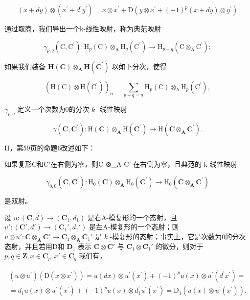 \[
(x + d y) \otimes (x ^ {\prime} + d ^ {\prime} y ^ {\prime}) = x \otimes x ^ {\prime} + \mathrm{D} (y \otimes x ^ {\prime} + (- 1) ^ {p} (x + d y) \otimes y ^ {\prime})
\]

通过取商，我们导出一个k-线性映射，称为典范映射

\[
\gamma_ {p, q} (\mathrm{C}, \mathrm{C} ^ {\prime}): \mathrm{H} _ {p} (\mathrm{C}) \otimes_ {\mathrm{A}} \mathrm{H} _ {q} (\mathrm{C} ^ {\prime}) \rightarrow \mathrm{H} _ {p + q} (\mathrm{C} \otimes_ {\mathrm{A}} \mathrm{C} ^ {\prime});
\]

如果我们装备 \(\mathbf{H}(\mathbf{C})\otimes_{\mathbf{A}}\mathbf{H}(\mathbf{C}^{\prime})\) 以如下分次，使得

\[
\left(\mathrm{H} (\mathrm{C}) \otimes \mathrm{H} (\mathrm{C} ^ {\prime})\right) _ {n} = \sum_ {p + q = n} \mathrm{H} _ {p} (\mathrm{C}) \otimes_ {\mathrm{A}} \mathrm{H} _ {p} (\mathrm{C} ^ {\prime}),
\]

\(\gamma_{p,q}\) 定义一个次数为0的分次 \(k\) -线性映射

\[
\gamma (\mathbf {C}, \mathbf {C} ^ {\prime}): \mathrm{H} (\mathbf {C}) \otimes_ {\mathbf {A}} \mathrm{H} (\mathbf {C} ^ {\prime}) \rightarrow \mathrm{H} (\mathbf {C} \otimes_ {\mathbf {A}} \mathbf {C} ^ {\prime}).
\]

II，第59页的命题6改述如下：

如果复形C和C'在右侧为零，则C ⊗\_A C' 在右侧为零，且典范的 k-线性映射

\[
\gamma_ {0, 0} (\mathbf {C}, \mathbf {C} ^ {\prime}): \mathrm{H} _ {0} (\mathbf {C}) \otimes_ {\mathbf {A}} \mathrm{H} _ {0} (\mathbf {C} ^ {\prime}) \rightarrow \mathrm{H} _ {0} (\mathbf {C} \otimes_ {\mathbf {A}} \mathbf {C} ^ {\prime})
\]

是双射。

设 \(u: (\mathbf{C}, d) \to (\mathbf{C}_1, d_1)\) 是右A-模复形的一个态射，且 \(u': (\mathbf{C}', d') \to (\mathbf{C}_1', d_1')\) 是左A-模复形的一个态射；则 \(u \otimes u': \mathbf{C} \otimes_{\mathbf{A}} \mathbf{C}' \to \mathbf{C}_1 \otimes_{\mathbf{A}} \mathbf{C}_1'\) 是 \(k\) -模复形的态射；事实上，它是次数为0的分次态射，并且若用D和 \(\mathbf{D}_1\) 表示 \(\mathbf{C} \otimes \mathbf{C}'\) 与 \(\mathbf{C}_1 \otimes \mathbf{C}_1'\) 的微分，则对于 \(p, q \in \mathbf{Z}, x \in \mathbf{C}_p, x' \in \mathbf{C}_q\) 我们有，

\[
\begin{array}{c} (u \otimes u ^ {\prime}) (\mathrm{D} (x \otimes x ^ {\prime})) = u (d x) \otimes u ^ {\prime} (x ^ {\prime}) + (- 1) ^ {p} u (x) \otimes u ^ {\prime} (d ^ {\prime} x ^ {\prime}) = \\ = d _ {1} u (x) \otimes u ^ {\prime} (x ^ {\prime}) + (- 1) ^ {p} u (x) \otimes d _ {1} ^ {\prime} u ^ {\prime} (x ^ {\prime}) = \mathrm{D} _ {1} (u (x) \otimes u ^ {\prime} (x ^ {\prime}))  . \end{array}
\]

